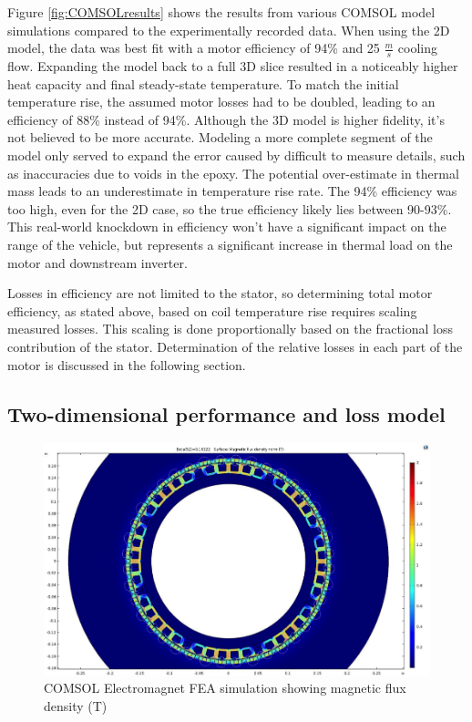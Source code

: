 \documentclass[]{aiaa-tc}%
\begin{document}
Figure \ref{fig:COMSOLresults} shows the results from various COMSOL model simulations compared to the experimentally recorded data. When using the 2D model, the data was best fit with a motor efficiency of 94\% and 25 $\frac{m}{s}$ cooling flow. Expanding the model back to a full 3D slice resulted in a noticeably higher heat capacity and final steady-state temperature. To match the initial temperature rise, the assumed motor losses had to be doubled, leading to an efficiency of 88\% instead of 94\%. Although the 3D model is higher fidelity, it's not believed to be more accurate. Modeling a more complete segment of the model only served to expand the error caused by difficult to measure details, such as inaccuracies due to voids in the epoxy. The potential over-estimate in thermal mass leads to an underestimate in temperature rise rate. The 94\% efficiency was too high, even for the 2D case, so the true efficiency likely lies between 90-93\%. This real-world knockdown in efficiency won't have a significant impact on the range of the vehicle, but represents a significant increase in thermal load on the motor and downstream inverter.

Losses in efficiency are not limited to the stator, so determining total motor efficiency, as stated above, based on coil temperature rise requires scaling measured losses. This scaling is done proportionally based on the fractional loss contribution of the stator. Determination of the relative losses in each part of the motor is discussed in the following section.

\subsection{Two-dimensional performance and loss model}

\begin{figure}[!htb]%
	\centering
	\includegraphics[width=1.0\textwidth]{figures/COMSOL_EM.png}
	\caption{COMSOL Electromagnet FEA simulation showing magnetic flux density (T)}
	\label{fig:COMSOL_EM}
\end{figure}
\end{document}
